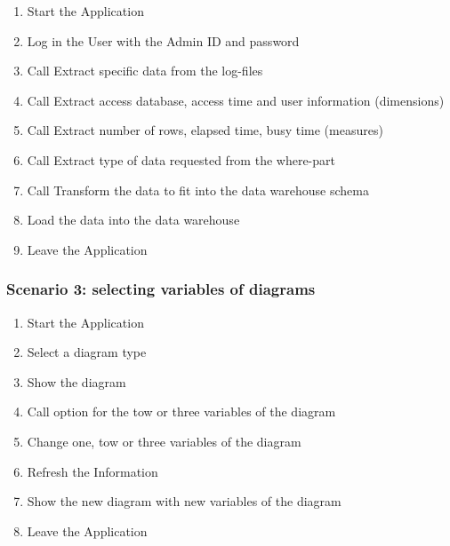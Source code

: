 \begin{enumerate}

\item Start the Application

\item Log in the User with the Admin ID and password

\item Call Extract specific data from the log-files

\item Call Extract access database, access time and user information (dimensions)

\item Call Extract number of rows, elapsed time, busy time (measures)

\item Call Extract type of data requested from the where-part

\item Call Transform the data to fit into the data warehouse schema

\item Load the data into the data warehouse

\item Leave the Application 

\end{enumerate} 

\subsubsection {Scenario 3: selecting variables of diagrams} 

\begin{enumerate}

\item Start the Application

\item Select a diagram type

\item Show the diagram

\item Call option for the tow or three variables of the diagram

\item Change one, tow or three variables of the diagram

\item Refresh the Information

\item Show the new diagram with new variables of the diagram

\item Leave the Application

\end{enumerate}

